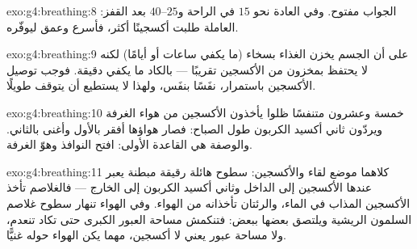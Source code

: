 \begin{solution}{exo:g4:breathing:8}
الجواب مفتوح. وفي العادة نحو $15$ في الراحة و$25$--$40$ بعد
القفز:  العاملة طلبت أكسجينًا أكثر، فأسرع  وعمق
ليوفّره.
\end{solution}

\begin{solution}{exo:g4:breathing:9}
على أن الجسم يخزن الغذاء بسخاء (ما يكفي ساعات أو أيامًا) لكنه لا
يحتفظ بمخزون من الأكسجين تقريبًا --- بالكاد ما يكفي دقيقة. فوجب
توصيل الأكسجين باستمرار، نفَسًا بنفَس، ولهذا لا يستطيع  أن
يتوقف طويلًا.
\end{solution}

\begin{solution}{exo:g4:breathing:10}
خمسة وعشرون متنفسًا ظلوا يأخذون الأكسجين من هواء الغرفة ويردّون
ثاني أكسيد الكربون طول الصباح: فصار هواؤها أفقر بالأول وأغنى
بالثاني. والوصفة هي القاعدة الأولى: افتح النوافذ وهوّ الغرفة.
\end{solution}

\begin{solution}{exo:g4:breathing:11}
كلاهما موضع لقاء  والأكسجين: سطوح هائلة رقيقة مبطنة 
يعبر عندها الأكسجين إلى الداخل وثاني أكسيد الكربون إلى الخارج ---
فالغلاصم تأخذ الأكسجين المذاب في الماء، والرئتان تأخذانه من
الهواء. وفي الهواء تنهار سطوح غلاصم السلمون الريشية ويلتصق بعضها
ببعض: فتنكمش مساحة العبور الكبرى حتى تكاد تنعدم، ولا مساحة عبور
يعني لا أكسجين، مهما يكن الهواء حوله غنيًّا.
\end{solution}
